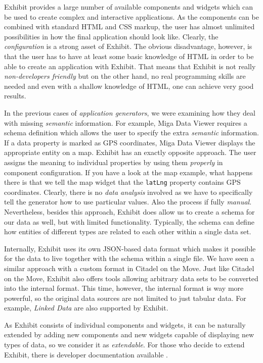 Exhibit provides a large number of available components and widgets which can be used to create complex and interactive applications. As the components can be combined with standard HTML and CSS markup, the user has almost unlimited possibilities in how the final application should look like. Clearly, the \emph{configuration} is a strong asset of Exhibit. The obvious disadvantage, however, is that the user has to have at least some basic knowledge of HTML in order to be able to create an application with Exhibit. That means that Exhibit is not really \emph{non-developers friendly} but on the other hand, no real programming skills are needed and even with a shallow knowledge of HTML, one can achieve very good results.

In the previous cases of \emph{application generators}, we were examining how they deal with missing \emph{semantic} information. For example, Miga Data Viewer requires a schema definition which allows the user to specify the extra \emph{semantic} information. If a data property is marked as GPS coordinates, Miga Data Viewer displays the appropriate entity on a map. Exhibit has an exactly opposite approach. The user assigns the meaning to individual properties by using them \emph{properly} in component configuration. If you have a look at the map example, what happens there is that we tell the map widget that the \texttt{latLng} property contains GPS coordinates. Clearly, there is no \emph{data analysis} involved as we have to specifically tell the generator how to use particular values. Also the process if fully \emph{manual}. Nevertheless, besides this approach, Exhibit does allow us to create a schema for our data as well, but with limited functionality. Typically, the schema can define how entities of different types are related to each other within a single data set.

Internally, Exhibit uses its own JSON-based data format which makes it possible for the data to live together with the schema within a single file. We have seen a similar approach with a custom format in Citadel on the Move. Just like Citadel on the Move, Exhibit also offers tools allowing arbitrary data sets to be converted into the internal format. This time, however, the internal format is way more powerful, so the original data sources are not limited to just tabular data. For example, \emph{Linked Data} are also supported by Exhibit.

As Exhibit consists of individual components and widgets, it can be naturally extended by adding new components and new widgets capable of displaying new types of data, so we consider it as \emph{extendable}. For those who decide to extend Exhibit, there is developer documentation available \cite{exhibit_documentation}.

